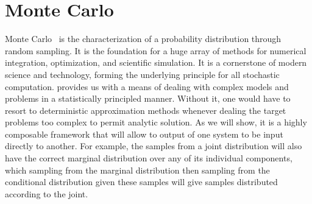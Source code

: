 
\section{Monte Carlo}
\label{sec:inf:mc}

Monte Carlo~\citep{metropolis1949monte} is the characterization of a probability distribution 
through random sampling. It is the foundation for a huge array of methods for numerical 
integration, optimization, and scientific simulation.  It is a cornerstone of modern science
and technology, forming the underlying principle for all stochastic computation.
\mc provides us with a means of dealing with complex models and problems in a
statistically principled manner.  Without it, one would have to resort to deterministic
approximation methods whenever dealing the target problems too complex to permit analytic
solution.  As we will show, it is a highly composable framework that will allow to output
of one system to be input directly to another.  For example, the \mc samples from a joint
distribution will also have the correct marginal distribution over any of its individual components,
which sampling from the marginal distribution then sampling from the conditional distribution
given these samples will give samples distributed according to the joint.

